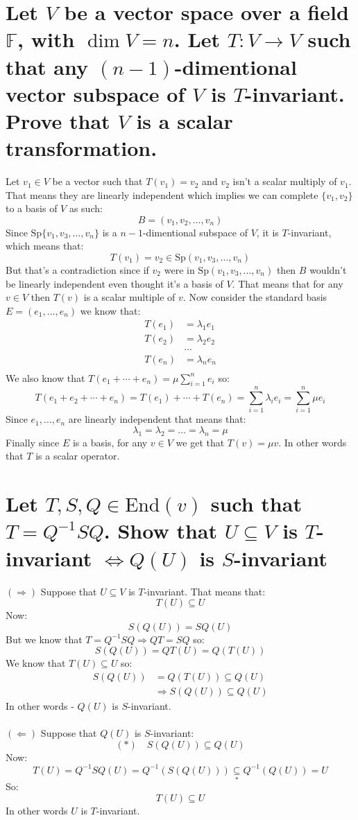 \documentclass[11pt,a4paper]{article}
\theoremstyle{plain}
\newcommand{\Sp}{\text{Sp}}
\newcommand{\F}{\mathbb{F}}
\begin{document}
	\section{Let $V$ be a vector space over a field $\F$, with $\dim V = n$. 
	Let $T \colon V \to V$ such that any $(n-1)$-dimentional vector subspace of 
	$V$ is $T$-invariant. Prove that $V$ is a scalar transformation.}
	Let $v_1\in V$ be a vector such that $T(v_1) = v_2$ and $v_2$ isn't a
	scalar multiply of $v_1$. That means they are linearly independent which
	implies we can complete $\{v_1,v_2\}$ to a basis of $V$ as such:
	\[
		B = (v_1,v_2,\dots,v_n)
	\] 
	Since $\Sp\{v_1,v_3,\dots,v_n\}$ is a $n-1$-dimentional subspace of $V$,
	it is $T$-invariant, which means that:
	\[
		T(v_1) = v_2 \in \Sp(v_1,v_3,\dots,v_n)
	\]
	But that's a contradiction since if $v_2$ were in $\Sp(v_1,v_3,\dots,v_n)$
	then $B$ wouldn't be linearly independent even thought it's a basis of $V$.
	That means that for any $v\in V$ then $T(v)$ is a scalar multiple of $v$.
	Now consider the standard basis $E=(e_1,\dots,e_n)$ we know that:
	\begin{align*} 
		T(e_1) &= \lambda_1e_1 \\
		T(e_2) &= \lambda_2e_2 \\
		&\dots \\
		T(e_n) &= \lambda_ne_n \\
	\end{align*}
	We also know that $T(e_1+\cdots+e_n) = \mu\sum_{i=1}^{n}{e_i}$ so:
	\[
		T(e_1+e_2+\cdots+e_n) = T(e_1) + \cdots + T(e_n) = 
		\sum_{i=1}^{n}{\lambda_ie_i} = \sum_{i=1}^{n}{\mu e_i}
	\]
	Since $e_1,\dots,e_n$ are linearly independent that means that:
	\[
		\lambda_1=\lambda_2=\dots=\lambda_n=\mu
	\]
	Finally since $E$ is a basis, for any $v\in V$ we get that $T(v) = \mu v$.
	In other words that $T$ is a scalar operator.
	
	\newpage
	
	\section{Let $T,S,Q\in\text{End}(v)$ such that $T = Q^{-1}SQ$. 
	Show that $U\subseteq V$ is $T$-invariant $\iff Q(U)$ is $S$-invariant}
	\underline{$(\Rightarrow)$} Suppose that $U\subseteq V$ is $T$-invariant.
	That means that:
	\[
		T(U)\subseteq U
	\]
	Now:
	\[
		S(Q(U)) = SQ(U)
	\]
	But we know that $T = Q^{-1}SQ \Rightarrow QT = SQ$ so:
	\[
		S(Q(U)) = QT(U) = Q(T(U))
	\]
	We know that $T(U)\subseteq U$ so:
	\begin{align*}
		S(Q(U)) &= Q(T(U)) \subseteq Q(U) \\
		&\Rightarrow S(Q(U)) \subseteq Q(U)
	\end{align*}
	In other words - $Q(U)$ is $S$-invariant. \\\\
	\underline{$(\Leftarrow)$} Suppose that $Q(U)$ is $S$-invariant:
	\[
		(*) \quad S(Q(U)) \subseteq Q(U)
	\]
	Now:
	\[
		T(U) = Q^{-1}SQ(U) = Q^{-1}(S(Q(U))) \underset{*}{\subseteq} 
		Q^{-1}(Q(U)) = U
	\]
	So:
	\[
		T(U) \subseteq U
	\]
	In other words $U$ is $T$-invariant.
	
\end{document}
